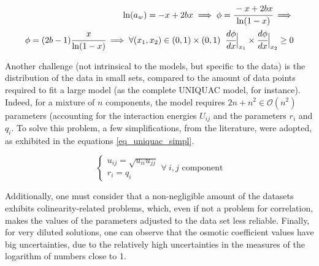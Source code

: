 \documentclass[
	12pt,				%
	openright,
	twoside,
	a4paper,			%
	brazil,			%
	french,				%
	english				%
	]{abntex2}
\begin{document}
\begin{equation}
	\label{eq_phi_virial_mono_frac}
	\begin{split}
		\ln(a_w) = -x + 2bx \implies \phi =
			\cfrac{-x + 2bx}{\ln(1-x)}\implies\\
		\phi = (2b-1)\cfrac{x}{\ln(1-x)} \implies
			\forall (x_1,x_2) \in (0,1)\times(0,1)\;\;
			\cfrac{d\phi}{dx}\Big|_{x_1} \times
			\cfrac{d\phi}{dx}\Big|_{x_2} \ge 0
	\end{split}
\end{equation}

Another challenge (not intrinsical to the models, but specific to the data)
is the distribution of the data in small sets, compared to the amount of
data points required to fit a large model (as the complete UNIQUAC model,
for instance). Indeed, for a mixture of $n$ components, the model requires
$2n+n^2 \in \mathcal{O}(n^2)$ parameters (accounting for the interaction
energies $U_{ij}$ and the parameters $r_i$ and $q_i$. To solve this problem,
a few simplifications, from the literature, were adopted, as exhibited in
the equations \ref{eq_uniquac_simpl}.

\begin{equation}
	\label{eq_uniquac_simpl}
	\begin{cases}
		u_{ij} = \sqrt{u_{ii}u_{jj}}\\
		r_i = q_i
	\end{cases}\forall\ i, j\text{ component}
\end{equation}

Additionally, one must consider that a non-negligible amount of the datasets
exhibits colinearity-related problems, which, even if not a problem for correlation,
makes the values of the parameters adjusted to the data set less reliable. Finally,
for very diluted solutions, one can observe that the osmotic coefficient values
have big uncertainties, due to the relatively high uncertainties in the measures
of the logarithm of numbers close to 1.
\end{document}
